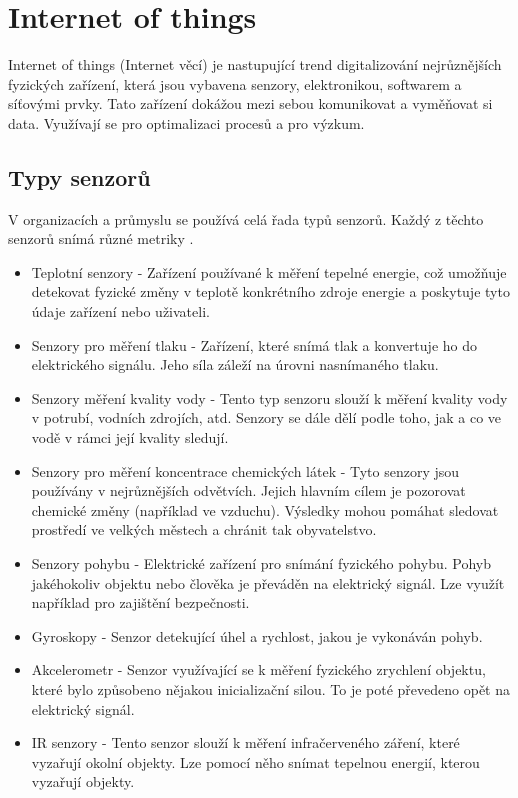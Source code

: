 \documentclass[thesis=M,czech]{FITthesis}[2018/10/20]
\begin{document}
\chapter{Internet of things}\label{textcompr}
Internet of things (Internet věcí) je nastupující trend digitalizování nejrůznějších fyzických zařízení, která jsou vybavena senzory, elektronikou,  softwarem a síťovými prvky. Tato zařízení dokážou mezi sebou komunikovat a vyměňovat si data. Využívají se pro optimalizaci procesů a pro výzkum.
	\section{Typy senzorů}
V organizacích a průmyslu se používá celá řada typů senzorů. Každý z těchto senzorů snímá různé metriky \cite{iot-types}.
\begin{itemize}
  \item Teplotní senzory -
Zařízení používané k měření tepelné energie, což umožňuje detekovat fyzické změny v teplotě konkrétního zdroje energie a poskytuje tyto údaje zařízení nebo uživateli.
  \item Senzory pro měření tlaku - Zařízení, které snímá tlak a konvertuje ho do elektrického signálu. Jeho síla záleží na úrovni nasnímaného tlaku.
  \item Senzory měření kvality vody - Tento typ senzoru slouží k měření kvality vody v potrubí, vodních zdrojích, atd. Senzory se dále dělí podle toho, jak a co ve vodě v rámci její kvality sledují.
  \item Senzory pro měření koncentrace chemických látek - Tyto senzory jsou používány v nejrůznějších odvětvích. Jejich hlavním cílem je pozorovat chemické změny (například ve vzduchu). Výsledky mohou pomáhat sledovat prostředí ve velkých městech a chránit tak obyvatelstvo.
  \item Senzory pohybu - Elektrické zařízení pro snímání fyzického pohybu. Pohyb jakéhokoliv objektu nebo člověka je převáděn na elektrický signál. Lze využít například pro zajištění bezpečnosti.
  \item Gyroskopy - Senzor detekující úhel a rychlost, jakou je vykonáván pohyb.
  \item Akcelerometr - Senzor využívající se k měření fyzického zrychlení objektu, které bylo způsobeno nějakou inicializační silou. To je poté převedeno opět na elektrický signál.
  \item IR senzory - Tento senzor slouží k měření infračerveného záření, které vyzařují okolní objekty. Lze pomocí něho snímat tepelnou energií, kterou vyzařují objekty.

\end{itemize}
\end{document}

